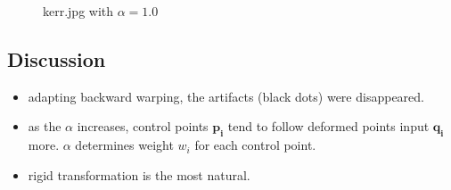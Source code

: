 \documentclass[paper=a4, fontsize=11pt]{scrartcl} %
\numberwithin{equation}{section} %
\numberwithin{figure}{section} %
\numberwithin{table}{section} %
\renewcommand{\vec}[1]{\mathbf{#1}}
\begin{document}
\begin{figure}[H]
\caption{kerr.jpg with $\alpha = 1.0$\label{fig:simple}}
\noindent{}
\end{figure}

\vspace*{-0.5in}

\subsection{Discussion}

\begin{itemize}
	\item adapting backward warping, the artifacts (black dots) were disappeared. 
	\item as the $\alpha$ increases, control points $\vec{p_i}$ tend to follow deformed points input $\vec{q_i}$ more. $\alpha$ determines weight $w_i$ for each control point.
	\item rigid transformation is the most natural.  
\end{itemize}
\end{document}
